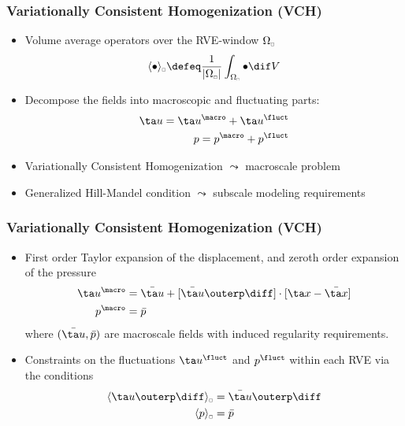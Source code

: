 \documentclass[11pt]{beamer} %
\DeclarePairedDelimiter{\homgen}{\langle}{\rangle_\rve}
\DeclarePairedDelimiter{\shomgen}{\langle\!\langle}{\rangle\!\rangle_\rve}
\newcommand{\volume}{|\Omega_\rve|}
\newcommand{\pore}{\mathrm{pore}}
\newcommand{\particle}{\mathrm{part}}
\newcommand{\rve}{
  {\mathchoice
   {\mbox{\scalebox{0.67}{$\Box$}}}
   {\mbox{\scalebox{0.67}{$\Box$}}}
   {\mbox{\scalebox{0.5}{$\Box$}}}
   {\mbox{\scalebox{0.375}{$\Box$}}}
  }
}
\begin{document}
\begin{frame}
 \frametitle{Variationally Consistent Homogenization (VCH)}
\begin{itemize}
 \item Volume average operators over the RVE-window $\Omega_\rve$
\begin{align*}
 \homgen{\bullet} \defeq \frac{1}{\volume} \int_{\Omega_\rve} \bullet \dif V%
\end{align*}
 \item Decompose the fields into macroscopic and fluctuating parts:
 \begin{align*}
  \ta u = \ta u^\macro + \ta u^\fluct
   \\
  p = p^\macro + p^\fluct
 \end{align*}
 \item Variationally Consistent Homogenization $\leadsto$ macroscale problem
 \item Generalized Hill-Mandel condition $\leadsto$ subscale modeling requirements
\end{itemize}
\end{frame}


\begin{frame}
 \frametitle{Variationally Consistent Homogenization (VCH)}
\begin{itemize}
 \item First order Taylor expansion of the displacement, and zeroth order expansion of the pressure
\begin{align*}
 \ta u^\macro &= \bar{\ta u} + [\bar{\ta u}\outerp\diff]\cdot[\ta x - \bar{\ta x}]
\\
 p^\macro &= \bar{p}
\end{align*}
where $(\bar{\ta u}, \bar{p})$ are macroscale fields with induced regularity requirements.
 \item Constraints on the fluctuations $\ta u^\fluct$ and $p^\fluct$ within each RVE via the conditions
\begin{align*}
 \homgen{\ta u\outerp\diff} &= \bar{\ta u}\outerp\diff
\\
 \homgen{p} &= \bar{p}
\end{align*}
\end{itemize}
\end{frame}
\end{document}
